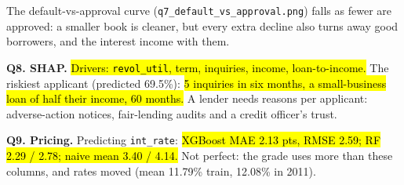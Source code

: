 \documentclass[10pt,a4paper]{article}
\newcommand{\q}[1]{\textbf{\color{blue!50!black}#1}}
\begin{document}
\vspace{1pt}
The default-vs-approval curve (\texttt{q7\_default\_vs\_approval.png}) falls as fewer are approved: a smaller book is
cleaner, but every extra decline also turns away good borrowers, and the interest income with them.

\q{Q8. SHAP.} \hl{Drivers: \texttt{revol\_util}, term, inquiries, income, loan-to-income.} The riskiest applicant
(predicted 69.5\%): \hl{5 inquiries in six months, a small-business loan of half their income, 60 months.} A lender needs
reasons per applicant: adverse-action notices, fair-lending audits and a credit officer's trust.

\q{Q9. Pricing.} Predicting \texttt{int\_rate}: \hl{XGBoost MAE 2.13 pts, RMSE 2.59; RF 2.29 / 2.78; naive mean 3.40 /
4.14.} Not perfect: the grade uses more than these columns, and rates moved (mean 11.79\% train, 12.08\% in 2011).
\end{document}
